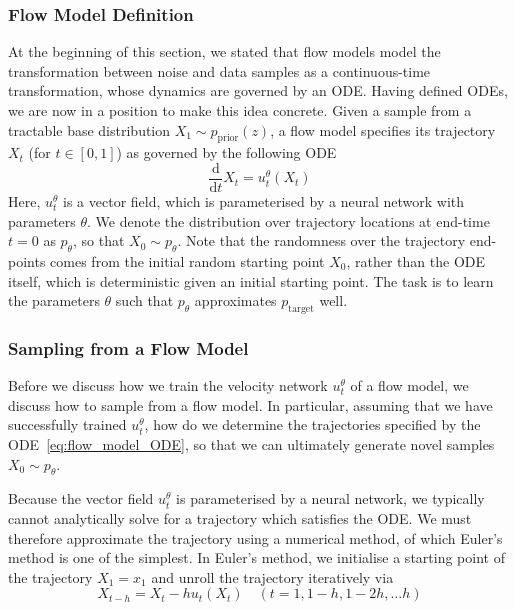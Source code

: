 \documentclass[12pt,a4paper]{report}
\begin{document}
\subsubsection{Flow Model Definition} At the beginning of this section, we stated that flow models model the transformation between noise and data samples as a continuous-time transformation, whose dynamics are governed by an ODE. 
Having defined ODEs, we are now in a position to make this idea concrete. %
Given a sample from a tractable base distribution $X_1 \sim p_{\text{prior}}(z)$, a flow model specifies its trajectory $X_t$ (for $t \in [0,1]$) as governed by the following ODE 
\begin{equation}
  \label{eq:flow_model_ODE}
  \frac{\mathrm{d}}{\mathrm{d}t} X_t = u_t^\theta(X_t)
\end{equation}
Here, $u_t^\theta$ is a vector field, which is parameterised by a neural network with parameters $\theta$. %
We denote the distribution over trajectory locations at end-time $t=0$ as $p_\theta$, so that $X_0 \sim p_\theta$. 
Note that the randomness over the trajectory end-points comes from the initial random starting point $X_0$, rather than the ODE itself, which is deterministic given an initial starting point. 
The task is to learn the parameters $\theta$ such that $p_\theta$ approximates $p_\text{target}$ well. 

\subsubsection{Sampling from a Flow Model}
Before we discuss how we train the velocity network $u_t^\theta$ of a flow model, we discuss how to sample from a flow model. 
In particular, assuming that we have successfully trained $u_t^\theta$, how do we determine the trajectories specified by the ODE~\ref{eq:flow_model_ODE}, so that we can ultimately generate novel samples $X_0 \sim p_\theta$. 

Because the vector field $u_t^\theta$ is parameterised by a neural network, we typically cannot analytically solve for a trajectory which satisfies the ODE. 
We must therefore approximate the trajectory using a numerical method, of which Euler's method is one of the simplest.
In Euler's method, we initialise a starting point of the trajectory $X_1 = x_1$ and unroll the trajectory iteratively via  
\begin{equation}
  \label{eq:Euler_sampling}
  X_{t-h} = X_t - h u_t(X_t) \quad (t = 1, 1-h, 1-2h, \dots h)
\end{equation}
\end{document}
